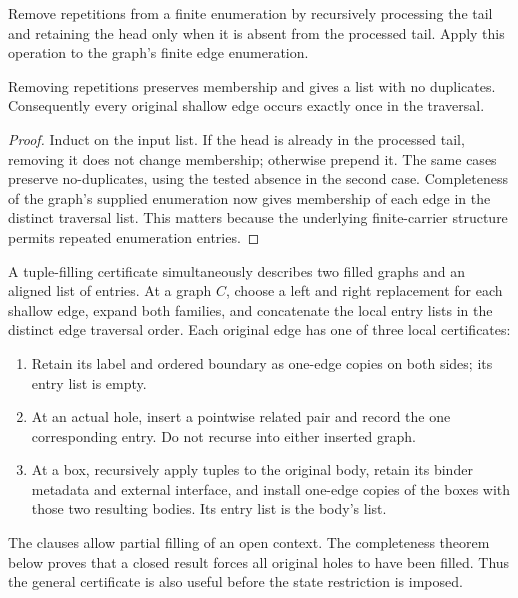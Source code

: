\begin{definition}
Remove repetitions from a finite enumeration by recursively processing the
tail and retaining the head only when it is absent from the processed tail.
Apply this operation to the graph's finite edge enumeration.
\end{definition}
\begin{lemma}
Removing repetitions preserves membership and gives a list with no duplicates.
Consequently every original shallow edge occurs exactly once in the traversal.
\end{lemma}
\begin{proof}
Induct on the input list. If the head is already in the processed tail, removing
it does not change membership; otherwise prepend it. The same cases preserve
no-duplicates, using the tested absence in the second case. Completeness of
the graph's supplied enumeration now gives membership of each edge in the
distinct traversal list. This matters because the underlying finite-carrier
structure permits repeated enumeration entries.
\end{proof}

\begin{definition}
A tuple-filling certificate simultaneously describes two filled graphs and an
aligned list of entries. At a graph $C$, choose a left and right replacement
for each shallow edge, expand both families, and concatenate the local entry
lists in the distinct edge traversal order. Each original edge has one of
three local certificates:
\begin{enumerate}
\item Retain its label and ordered boundary as one-edge copies on both sides;
its entry list is empty.
\item At an actual hole, insert a pointwise related pair and record the one
corresponding entry. Do not recurse into either inserted graph.
\item At a box, recursively apply tuples to the original body, retain its
binder metadata and external interface, and install one-edge copies of the
boxes with those two resulting bodies. Its entry list is the body's list.
\end{enumerate}
\end{definition}
The clauses allow partial filling of an open context. The completeness theorem
below proves that a closed result forces all original holes to have been
filled. Thus the general certificate is also useful before the state
restriction is imposed.

